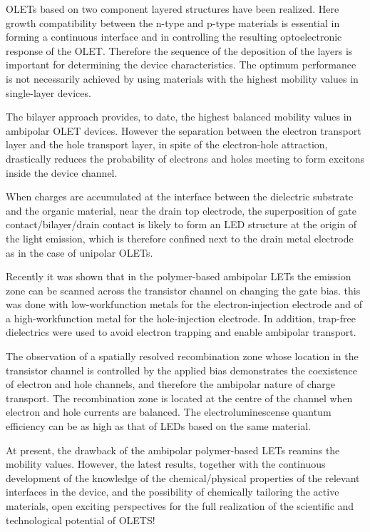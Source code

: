OLETs based on two component layered structures have been realized. Here growth compatibility between the n-type and p-type materials is essential in forming a continuous interface and in controlling the resulting optoelectronic response of the OLET. Therefore the sequence of the deposition of the layers is important for determining the device characteristics. The optimum performance is not necessarily achieved by using materials with the highest mobility values in single-layer devices. 

The bilayer approach provides, to date, the highest balanced mobility values in ambipolar OLET devices. However the separation between the electron transport layer and the hole transport layer, in spite of the electron-hole attraction, drastically reduces the probability of electrons and holes meeting to form excitons inside the device channel. 

When charges are accumulated at the interface between the dielectric substrate and the organic material, near the drain top electrode, the superposition of gate contact/bilayer/drain contact is likely to form an LED structure at the origin of the light emission, which is therefore confined next to the drain metal electrode as in the case of unipolar OLETs.

Recently it was shown that in the polymer-based ambipolar LETs the emission zone can be scanned across the transistor channel on changing the gate bias. this was done with low-workfunction metals for the electron-injection electrode and of a high-workfunction metal for the hole-injection electrode. In addition, trap-free dielectrics were used to avoid electron trapping and enable ambipolar transport. 

The observation of a spatially resolved recombination zone whose location in the transistor channel is controlled by the applied bias demonstrates the coexistence of electron and hole channels, and therefore the ambipolar nature of charge transport. The recombination zone is located at the centre of the channel when electron and hole currents are balanced. The electroluminescense quantum efficiency can be as high as that of LEDs based on the same material. 

At present, the drawback of the ambipolar polymer-based LETs reamins the mobility values. However, the latest results, together with the continuous development of the knowledge of the chemical/physical properties of the relevant interfaces in the device, and the possibility of chemically tailoring the active materials, open exciting perspectives for the full realization of the scientific and technological potential of OLETS!





